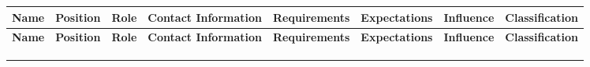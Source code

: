 \documentclass[10pt,letterpaper]{article}
\renewcommand\arraystretch{1.25}
\begin{document}
\begin{landscape}
\begin{center}
\begingroup
\setlength\tabcolsep{2.0pt}
\scriptsize
\renewcommand\arraystretch{1.55}
\begin{longtable}{|>{\raggedright\arraybackslash}p{1.026in}|>{\raggedright\arraybackslash}p{1.026in}|>{\raggedright\arraybackslash}p{1.026in}|>{\raggedright\arraybackslash}p{1.026in}|>{\raggedright\arraybackslash}p{1.026in}|>{\raggedright\arraybackslash}p{1.026in}|>{\raggedright\arraybackslash}p{1.026in}|>{\raggedright\arraybackslash}p{1.026in}|}
\hline
\rowcolor{light}
\textbf{Name} & \textbf{Position} & \textbf{Role} & \textbf{Contact Information} & \textbf{Requirements} & \textbf{Expectations} & \textbf{Influence} & \textbf{Classification} \\ \hline
\endfirsthead
\hline\rowcolor{light} \textbf{Name} & \textbf{Position} & \textbf{Role} & \textbf{Contact Information} & \textbf{Requirements} & \textbf{Expectations} & \textbf{Influence} & \textbf{Classification} \\ \hline
\endhead
\rule{0pt}{11pt}\hspace{0pt} & \rule{0pt}{11pt}\hspace{0pt} & \rule{0pt}{11pt}\hspace{0pt} & \rule{0pt}{11pt}\hspace{0pt} & \rule{0pt}{11pt}\hspace{0pt} & \rule{0pt}{11pt}\hspace{0pt} & \rule{0pt}{11pt}\hspace{0pt} & \rule{0pt}{11pt}\hspace{0pt} \\ \hline
\rule{0pt}{11pt}\hspace{0pt} & \rule{0pt}{11pt}\hspace{0pt} & \rule{0pt}{11pt}\hspace{0pt} & \rule{0pt}{11pt}\hspace{0pt} & \rule{0pt}{11pt}\hspace{0pt} & \rule{0pt}{11pt}\hspace{0pt} & \rule{0pt}{11pt}\hspace{0pt} & \rule{0pt}{11pt}\hspace{0pt} \\ \hline
\rule{0pt}{11pt}\hspace{0pt} & \rule{0pt}{11pt}\hspace{0pt} & \rule{0pt}{11pt}\hspace{0pt} & \rule{0pt}{11pt}\hspace{0pt} & \rule{0pt}{11pt}\hspace{0pt} & \rule{0pt}{11pt}\hspace{0pt} & \rule{0pt}{11pt}\hspace{0pt} & \rule{0pt}{11pt}\hspace{0pt} \\ \hline

\end{longtable}
\end{center}
\end{landscape}
\end{document}
